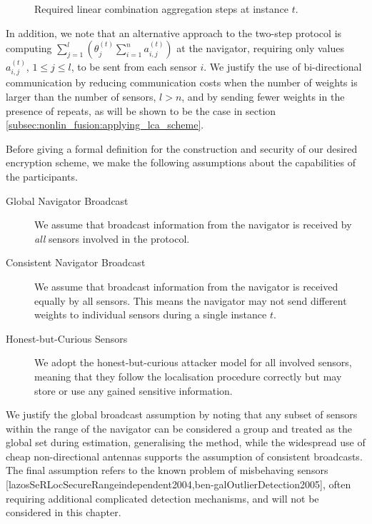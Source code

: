 \begin{figure}[htbp]
\caption{Required linear combination aggregation steps at instance $t$.}
\label{fig:nonlin_fusion:aggregation_steps}
\end{figure}
In addition, we note that an alternative approach to the two-step protocol is computing $\sum^{l}_{j=1}(\theta_j^{(t)}\sum^{n}_{i=1} a_{i,j}^{(t)})$ at the navigator, requiring only values $a_{i,j}^{(t)}$, $1\leq j \leq l$, to be sent from each sensor $i$. We justify the use of bi-directional communication by reducing communication costs when the number of weights is larger than the number of sensors, $l>n$, and by sending fewer weights in the presence of repeats, as will be shown to be the case in section \ref{subsec:nonlin_fusion:applying_lca_scheme}.

Before giving a formal definition for the construction and security of our desired encryption scheme, we make the following assumptions about the capabilities of the participants.
\begin{description}
    \item[Global Navigator Broadcast] We assume that broadcast information from the navigator is received by \textit{all} sensors involved in the protocol.
    \item[Consistent Navigator Broadcast] We assume that broadcast information from the navigator is received equally by all sensors. This means the navigator may not send different weights to individual sensors during a single instance $t$.
    \item[Honest-but-Curious Sensors] We adopt the honest-but-curious attacker model for all involved sensors, meaning that they follow the localisation procedure correctly but may store or use any gained sensitive information.
\end{description}
We justify the global broadcast assumption by noting that any subset of sensors within the range of the navigator can be considered a group and treated as the global set during estimation, generalising the method, while the widespread use of cheap non-directional antennas supports the assumption of consistent broadcasts. The final assumption refers to the known problem of misbehaving sensors [lazosSeRLocSecureRangeindependent2004,ben-galOutlierDetection2005], often requiring additional complicated detection mechanisms, and will not be considered in this chapter.

